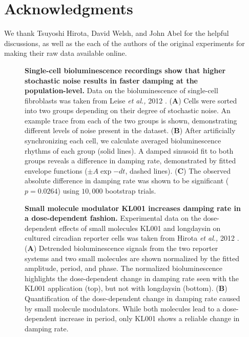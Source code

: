 \documentclass[11pt, letterpaper]{article}
\begin{document}
\section*{Acknowledgments}
We thank Tsuyoshi Hirota, David Welsh, and John Abel for the helpful discussions, as well as the each of the authors of the original experiments for making their raw data available online.





\clearpage

\begin{figure}[h!]
  \begin{center}
  \end{center}
  \caption{{\bfseries Single-cell bioluminescence recordings show that higher stochastic noise results in faster damping at the population-level.}
  Data on the bioluminescence of single-cell fibroblasts was taken from Leise {\itshape et al.,} 2012 \cite{Leise2012}.
({\bfseries A}) Cells were sorted into two groups depending on their degree of stochastic noise. An example trace from each of the two groups is shown, demonstrating different levels of noise present in the dataset.
({\bfseries B}) After artificially synchronizing each cell, we calculate averaged bioluminescence rhythms of each group (solid lines). A damped sinusoid fit to both groups reveals a difference in damping rate, demonstrated by fitted envelope functions ($\pm A\exp{-dt}$, dashed lines).
({\bfseries C}) The observed absolute difference in damping rate was shown to be significant ($p = 0.0264$) using $10,000$ bootstrap trials.}
\label{fig:fibroblast_noise}
\end{figure}

\begin{figure}[h!]
  \begin{center}
  \end{center}
  \caption{{\bfseries Small molecule modulator KL001 increases damping rate in a dose-dependent fashion.}
  Experimental data on the dose-dependent effects of small molecules KL001 and longdaysin on cultured circadian reporter cells was taken from Hirota {\itshape et al.,} 2012 \cite{Hirota2012}.
({\bfseries A}) Detrended bioluminescence signals from the two reporter systems and two small molecules are shown normalized by the fitted amplitude, period, and phase. The normalized bioluminescence highlights the dose-dependent change in damping rate seen with the KL001 application (top), but not with longdaysin (bottom).
({\bfseries B}) Quantification of the dose-dependent change in damping rate caused by small molecule modulators. While both molecules lead to a dose-dependent increase in period, only KL001 shows a reliable change in damping rate.}
\label{fig:dose_dependence}
\end{figure}
\end{document}
